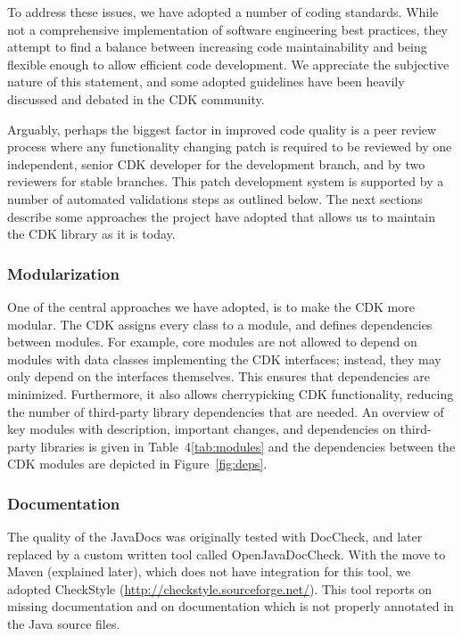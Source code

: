 \documentclass[10pt]{bmcart}
\begin{document}
To address these issues, we have adopted a number of coding
standards. While not a comprehensive implementation of software
engineering best practices, they attempt to find a balance between
increasing code maintainability and being flexible enough to allow
efficient code development. We appreciate the subjective
nature of this statement, and some adopted guidelines have been
heavily discussed and debated in the CDK community.

Arguably, perhaps the biggest factor in improved code quality is a
peer review process where any functionality changing patch is required
to be reviewed by one independent, senior CDK developer for the
development branch, and by two reviewers for stable branches. This patch
development system is supported by a number of automated validations
steps as outlined below.
The next sections describe some approaches the project have adopted that allows
us to maintain the CDK library as it is today. 

\subsubsection*{Modularization}

One of the central approaches we have adopted, is to make the CDK more modular. The CDK assigns
every class to a module, and defines dependencies between modules. For example, core modules
are not allowed to depend on modules with data classes implementing the CDK interfaces;
instead, they may only depend on the interfaces themselves. This ensures that
dependencies are minimized. Furthermore, it also allows cherrypicking CDK
functionality, reducing the number of third-party library dependencies that are
needed.
An overview of key modules with description, important changes, and dependencies
on third-party libraries is given in Table~4\ref{tab:modules} and the dependencies
between the CDK modules are depicted in
Figure~\ref{fig:deps}.


\subsubsection*{Documentation}

The quality of the JavaDocs was originally tested with DocCheck, and
later replaced by a custom written tool called OpenJavaDocCheck. With the move
to Maven (explained later), which does not have integration for this tool,
we adopted CheckStyle (\url{http://checkstyle.sourceforge.net/}). This tool
reports on missing documentation and on documentation which is not properly
annotated in the Java source files.
\end{document}

